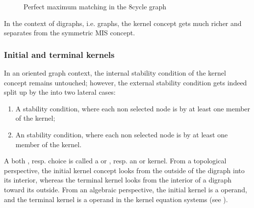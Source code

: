 \documentclass[a4paper,12pt,english]{sphinxhowto}
\let\sphinxpxdimen\pdfpxdimen\else\newdimen\sphinxpxdimen
\begin{document}
\begin{figure}[H]
\centering
\capstart

\noindent\sphinxincludegraphics[width=300\sphinxpxdimen]{{maxMatchingcycleGraph}.png}
\caption{Perfect maximum matching in the 8\sphinxhyphen{}cycle graph}\label{\detokenize{pearls:id133}}\end{figure}

\sphinxAtStartPar
In the context of digraphs, i.e.  graphs, the kernel concept gets much richer and separates from the symmetric MIS concept.


\subsubsection{Initial and terminal kernels}
\label{\detokenize{pearls:initial-and-terminal-kernels}}
\sphinxAtStartPar
In an oriented graph context, the internal stability condition of the kernel concept remains untouched; however, the external stability condition gets indeed split up by the  into two lateral cases:
\begin{enumerate}
%
\item {} 
\sphinxAtStartPar
A  stability condition, where each non selected node is  by at least one member of the kernel;

\item {} 
\sphinxAtStartPar
An  stability condition, where each non selected node is  by at least one member of the kernel.

\end{enumerate}

\sphinxAtStartPar
A both   , resp.  choice is called a  or , resp. an  or  kernel. From a topological perspective, the initial kernel concept looks from the outside of the digraph into its interior, whereas the terminal kernel looks from the interior of a digraph toward its outside. From an algebraic perspective, the initial kernel is a  operand, and the terminal kernel is a  operand in the kernel equation systems (see ).
\end{document}
